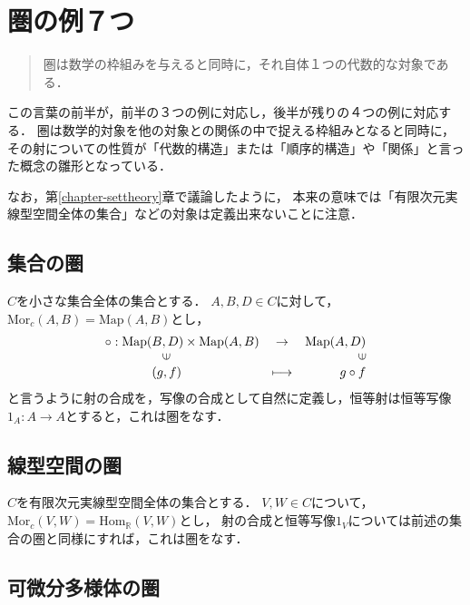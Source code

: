 \documentclass[uplatex, dvipdfmx]{jsreport}
\begin{document}
\section{圏の例７つ}

\begin{quote}
    圏は数学の枠組みを与えると同時に，それ自体１つの代数的な対象である．\cite{数学原論}
\end{quote}
この言葉の前半が，前半の３つの例に対応し，後半が残りの４つの例に対応する．
圏は数学的対象を他の対象との関係の中で捉える枠組みとなると同時に，その射についての性質が「代数的構造」または「順序的構造」や「関係」と言った概念の雛形となっている．

\begin{remark*}
    なお，第\ref{chapter-settheory}章で議論したように，
    本来の意味では「有限次元実線型空間全体の集合」などの対象は定義出来ないことに注意．
\end{remark*}

\subsection{集合の圏}

$C$を小さな集合全体の集合とする．
$A,B,D\in C$に対して，$\mathrm{Mor}_c(A,B)=\mathrm{Map}(A,B)$とし，
\[\begin{array}{lcr}\circ : \mathrm{Map}(B,D)\times\mathrm{Map}(A,B)&\rightarrow&\mathrm{Map}(A,D)\\ \hspace{16mm}\rotatebox{90}{$\in$} & & \rotatebox{90}{$\in$}\\ \hspace{13mm}(g,f) & \longmapsto & g\circ f \end{array}\]
と言うように射の合成を，写像の合成として自然に定義し，恒等射は恒等写像$1_A:A\rightarrow A$とすると，これは圏をなす．

\subsection{線型空間の圏}

$C$を有限次元実線型空間全体の集合とする．
$V,W\in C$について，$\mathrm{Mor}_c(V,W)=\mathrm{Hom}_\mathbb{R}(V,W)$とし，
射の合成と恒等写像$1_V$については前述の集合の圏と同様にすれば，これは圏をなす．

\subsection{可微分多様体の圏}
\end{document}
